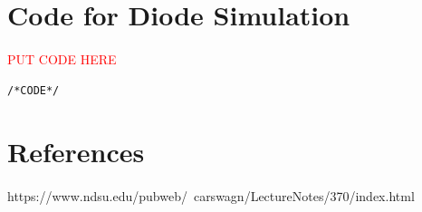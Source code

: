 \documentclass[a4paper]{article}
\begin{document}
\section{Code for Diode Simulation}
\paragraph{}
\textcolor{red}{PUT CODE HERE}
\begin{lstlisting}
/*CODE*/

\end{lstlisting}
\section{References}
\paragraph{}
https://www.ndsu.edu/pubweb/~carswagn/LectureNotes/370/index.html
\end{document}
